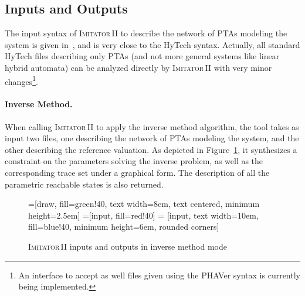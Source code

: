 \documentclass[a4paper,10pt]{article}
\newcommand{\A}{\mathcal{A}}
\newcommand{\hytech}{{\sc HyTech}}
\newcommand{\imitatordeux}{\textsc{Imitator}\,II}
\newcommand{\phaver}{PHAVer}
\newcommand{\paragraphe}[1]{\paragraph{#1.}}
\begin{document}
\subsection{Inputs and Outputs}

The input syntax of \imitatordeux{} to describe the network of PTAs modeling the system is given in~\cite{imitator2_web}, and is very close to the \hytech{} syntax.
Actually, all standard \hytech{} files describing only PTAs (and not more general systems like linear hybrid automata\cite{achh92}) can be analyzed directly by \imitatordeux{} with very minor changes\footnote{An interface to accept as well files given using the \phaver{} syntax is currently being implemented.}.


\paragraphe{Inverse Method}
When calling \imitatordeux{} to apply the inverse method algorithm, the tool takes as input two files, one describing the network of PTAs modeling the system, and the other describing the reference valuation.
As depicted in Figure~\ref{fig:ioIM}, it synthesizes a constraint on the parameters solving the inverse problem, as well as the corresponding trace set under a graphical form.
The description of all the parametric reachable states is also returned.

\begin{figure}[ht!]
=[draw, fill=green!40, text width=8em,
    text centered, minimum height=2.5em]
=[input, fill=red!40]
 = [input, text width=10em, fill=blue!40,
    minimum height=6em, rounded corners]
\def\blockdist{2.3}
\def\edgedist{2.5}

{

\centering


}

\caption{\imitatordeux{} inputs and outputs in inverse method mode}
\label{fig:ioIM}
\end{figure}
\end{document}
